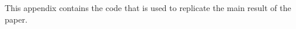 \documentclass[12pt]{jfm}
\begin{document}




\newpage

\appendix

\section{}\label{appA}

This appendix contains the code that is used to replicate the main result of the paper.

%   


\end{document}
